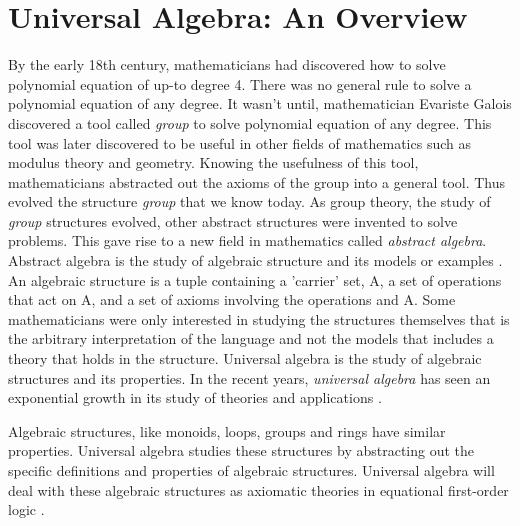 \chapter{Universal Algebra: An Overview}
By the early 18th century, mathematicians had discovered how to solve polynomial
equation of up-to degree 4. There was no general rule to solve a polynomial
equation of any degree. It wasn't until, mathematician Evariste Galois
discovered a tool called \emph{group} to solve polynomial equation of any
degree. This tool was later discovered to be useful in other fields of
mathematics such as modulus theory and geometry\cite{enwiki:1107380309}. Knowing
the usefulness of this tool, mathematicians abstracted out the axioms of the
group into a general tool. Thus evolved the structure \emph{group} that we know
today. As group theory, the study of \emph{group} structures evolved, other
abstract structures were invented to solve problems. This gave rise to a new
field in mathematics called \emph{abstract algebra}. Abstract algebra is the
study of algebraic structure and its models or examples
\cite{enwiki:1107380309}. An algebraic structure is a tuple containing a
'carrier' set, A, a set of operations that act on A, and a set of axioms
involving the operations and A. Some mathematicians were only interested in
studying the structures themselves that is the arbitrary interpretation of the
language and not the models that includes a theory that holds in the structure.
Universal algebra is the study of algebraic structures and its properties. In
the recent years, \emph{universal algebra} has seen an exponential growth in its
study of theories and applications \cite{sankappanavar1981course}. 

Algebraic structures, like monoids, loops, groups and rings have similar
properties. Universal algebra studies these structures by abstracting out the
specific definitions and properties of algebraic structures. Universal algebra
will deal with these algebraic structures as axiomatic theories in equational
first-order logic \cite{YSharoda}.

